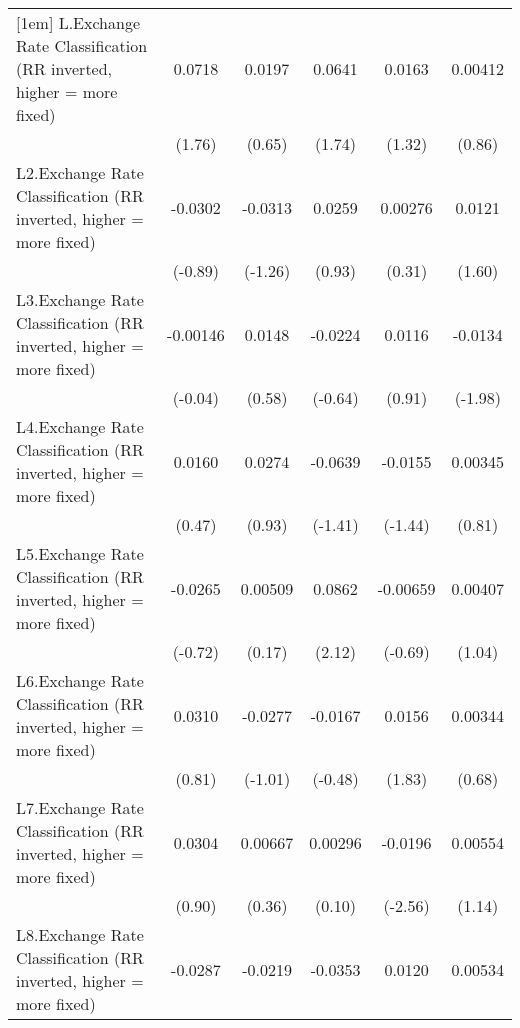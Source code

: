 {\begin{tabular}{l*{5}{c}}
[1em]
L.Exchange Rate Classification (RR inverted, higher = more fixed)&   0.0718         &   0.0197         &   0.0641         &   0.0163         &  0.00412         \\
                &   (1.76)         &   (0.65)         &   (1.74)         &   (1.32)         &   (0.86)         \\
[1em]
L2.Exchange Rate Classification (RR inverted, higher = more fixed)&  -0.0302         &  -0.0313         &   0.0259         &  0.00276         &   0.0121         \\
                &  (-0.89)         &  (-1.26)         &   (0.93)         &   (0.31)         &   (1.60)         \\
[1em]
L3.Exchange Rate Classification (RR inverted, higher = more fixed)& -0.00146         &   0.0148         &  -0.0224         &   0.0116         &  -0.0134\sym{*}  \\
                &  (-0.04)         &   (0.58)         &  (-0.64)         &   (0.91)         &  (-1.98)         \\
[1em]
L4.Exchange Rate Classification (RR inverted, higher = more fixed)&   0.0160         &   0.0274         &  -0.0639         &  -0.0155         &  0.00345         \\
                &   (0.47)         &   (0.93)         &  (-1.41)         &  (-1.44)         &   (0.81)         \\
[1em]
L5.Exchange Rate Classification (RR inverted, higher = more fixed)&  -0.0265         &  0.00509         &   0.0862\sym{*}  & -0.00659         &  0.00407         \\
                &  (-0.72)         &   (0.17)         &   (2.12)         &  (-0.69)         &   (1.04)         \\
[1em]
L6.Exchange Rate Classification (RR inverted, higher = more fixed)&   0.0310         &  -0.0277         &  -0.0167         &   0.0156         &  0.00344         \\
                &   (0.81)         &  (-1.01)         &  (-0.48)         &   (1.83)         &   (0.68)         \\
[1em]
L7.Exchange Rate Classification (RR inverted, higher = more fixed)&   0.0304         &  0.00667         &  0.00296         &  -0.0196\sym{*}  &  0.00554         \\
                &   (0.90)         &   (0.36)         &   (0.10)         &  (-2.56)         &   (1.14)         \\
[1em]
L8.Exchange Rate Classification (RR inverted, higher = more fixed)&  -0.0287         &  -0.0219         &  -0.0353         &   0.0120         &  0.00534         \\

\end{tabular}}
